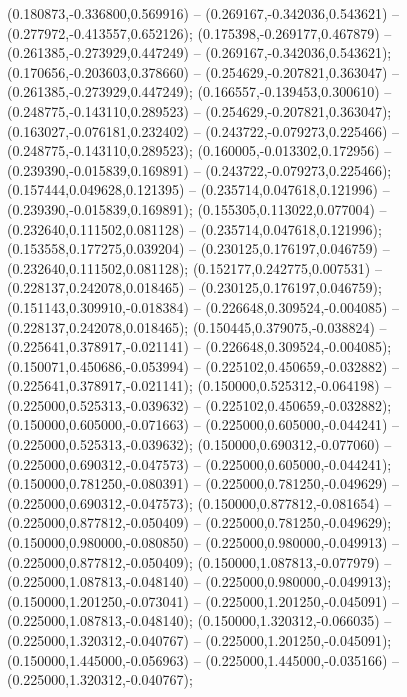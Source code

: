  (0.180873,-0.336800,0.569916) -- (0.269167,-0.342036,0.543621) -- (0.277972,-0.413557,0.652126);
 (0.175398,-0.269177,0.467879) -- (0.261385,-0.273929,0.447249) -- (0.269167,-0.342036,0.543621);
 (0.170656,-0.203603,0.378660) -- (0.254629,-0.207821,0.363047) -- (0.261385,-0.273929,0.447249);
 (0.166557,-0.139453,0.300610) -- (0.248775,-0.143110,0.289523) -- (0.254629,-0.207821,0.363047);
 (0.163027,-0.076181,0.232402) -- (0.243722,-0.079273,0.225466) -- (0.248775,-0.143110,0.289523);
 (0.160005,-0.013302,0.172956) -- (0.239390,-0.015839,0.169891) -- (0.243722,-0.079273,0.225466);
 (0.157444,0.049628,0.121395) -- (0.235714,0.047618,0.121996) -- (0.239390,-0.015839,0.169891);
 (0.155305,0.113022,0.077004) -- (0.232640,0.111502,0.081128) -- (0.235714,0.047618,0.121996);
 (0.153558,0.177275,0.039204) -- (0.230125,0.176197,0.046759) -- (0.232640,0.111502,0.081128);
 (0.152177,0.242775,0.007531) -- (0.228137,0.242078,0.018465) -- (0.230125,0.176197,0.046759);
 (0.151143,0.309910,-0.018384) -- (0.226648,0.309524,-0.004085) -- (0.228137,0.242078,0.018465);
 (0.150445,0.379075,-0.038824) -- (0.225641,0.378917,-0.021141) -- (0.226648,0.309524,-0.004085);
 (0.150071,0.450686,-0.053994) -- (0.225102,0.450659,-0.032882) -- (0.225641,0.378917,-0.021141);
 (0.150000,0.525312,-0.064198) -- (0.225000,0.525313,-0.039632) -- (0.225102,0.450659,-0.032882);
 (0.150000,0.605000,-0.071663) -- (0.225000,0.605000,-0.044241) -- (0.225000,0.525313,-0.039632);
 (0.150000,0.690312,-0.077060) -- (0.225000,0.690312,-0.047573) -- (0.225000,0.605000,-0.044241);
 (0.150000,0.781250,-0.080391) -- (0.225000,0.781250,-0.049629) -- (0.225000,0.690312,-0.047573);
 (0.150000,0.877812,-0.081654) -- (0.225000,0.877812,-0.050409) -- (0.225000,0.781250,-0.049629);
 (0.150000,0.980000,-0.080850) -- (0.225000,0.980000,-0.049913) -- (0.225000,0.877812,-0.050409);
 (0.150000,1.087813,-0.077979) -- (0.225000,1.087813,-0.048140) -- (0.225000,0.980000,-0.049913);
 (0.150000,1.201250,-0.073041) -- (0.225000,1.201250,-0.045091) -- (0.225000,1.087813,-0.048140);
 (0.150000,1.320312,-0.066035) -- (0.225000,1.320312,-0.040767) -- (0.225000,1.201250,-0.045091);
 (0.150000,1.445000,-0.056963) -- (0.225000,1.445000,-0.035166) -- (0.225000,1.320312,-0.040767);
